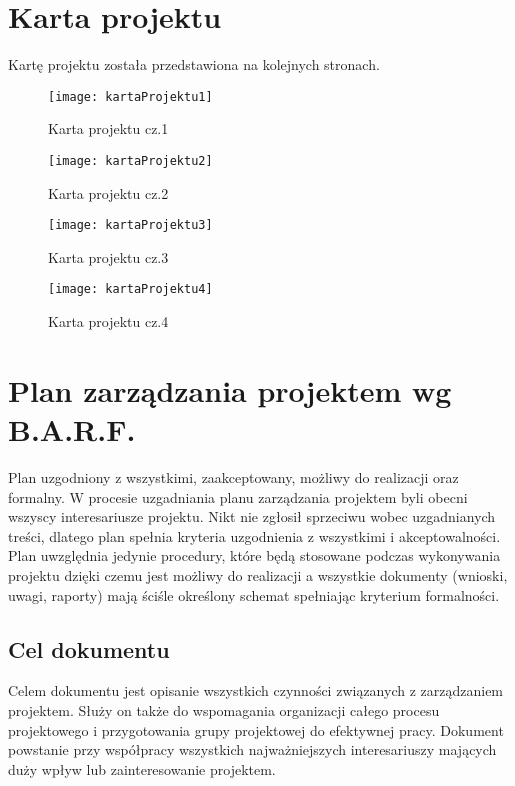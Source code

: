 
\section{Karta projektu}
Kartę projektu została przedstawiona na kolejnych stronach.
\begin{figure}[!h]
\centering
\texttt{[image: kartaProjektu1]}
\caption{Karta projektu cz.1}
\label{kartaProjektu1}
\end{figure}

\begin{figure}[!h]
\centering
\texttt{[image: kartaProjektu2]}
\caption{Karta projektu cz.2}
\label{kartaProjektu2}
\end{figure}

\begin{figure}[!h]
\centering
\texttt{[image: kartaProjektu3]}
\caption{Karta projektu cz.3}
\label{kartaProjektu3}
\end{figure}

\begin{figure}[!h]
\centering
\texttt{[image: kartaProjektu4]}
\caption{Karta projektu cz.4}
\label{kartaProjektu4}
\end{figure}

\clearpage


\section{Plan zarządzania projektem wg B.A.R.F.}

Plan uzgodniony z wszystkimi, zaakceptowany, możliwy do realizacji oraz formalny. W procesie uzgadniania planu zarządzania projektem byli obecni wszyscy interesariusze projektu. Nikt nie zgłosił sprzeciwu wobec uzgadnianych treści, dlatego plan spełnia kryteria uzgodnienia z wszystkimi i akceptowalności. Plan uwzględnia jedynie procedury, które będą stosowane podczas wykonywania projektu dzięki czemu jest możliwy do realizacji a wszystkie dokumenty (wnioski, uwagi, raporty) mają ściśle określony schemat spełniając kryterium formalności.

\subsection*{Cel dokumentu}
Celem dokumentu jest opisanie wszystkich czynności związanych z zarządzaniem projektem. Służy on także do wspomagania organizacji całego procesu projektowego i przygotowania grupy projektowej do efektywnej pracy. Dokument powstanie przy współpracy wszystkich najważniejszych interesariuszy mających duży wpływ lub zainteresowanie projektem.

